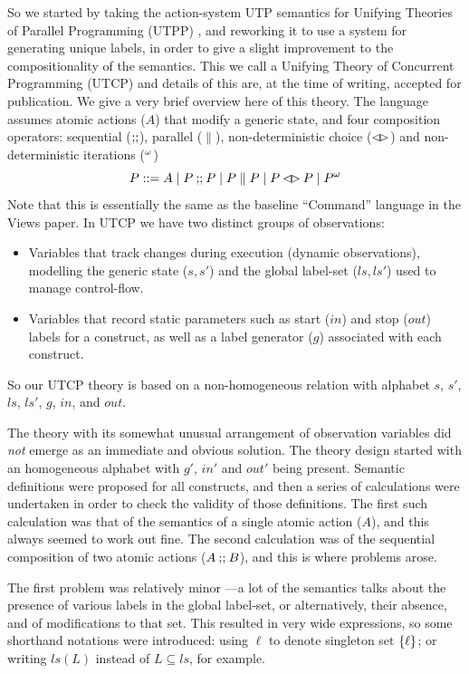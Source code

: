 So we started by taking the action-system UTP semantics for Unifying Theories
of Parallel Programming (UTPP) \cite{DBLP:conf/icfem/WoodcockH02},
and reworking it to use a system for generating unique labels,
in order to give a slight improvement to the compositionality
of the semantics. This we call a Unifying Theory of Concurrent Programming
(UTCP) and details of this are,
at the time of writing,
accepted for publication\cite{conf/tase/BMN16}.
We give a very brief overview here of this theory.
The language assumes atomic actions ($A$) that modify a generic state,
and four composition operators: sequential ($\mathrel{\mathbf{;\!;}}$), parallel ($\parallel$),
non-deterministic choice ($\mathbin{\lhd\!\rhd}$) and non-deterministic iterations (${}^{\omega}$)
\[
   P ::= A \mid P \mathbin{\mathbf{;\!;}} P \mid P \parallel P \mid P \mathbin{\lhd\!\rhd} P \mid {P}^{\omega}
\]
Note that this is essentially the same as the baseline ``Command'' language
in the Views paper\cite{conf/popl/Dinsdale-YoungBGPY13}.
In UTCP we have two distinct groups of observations:
\begin{itemize}
  \item
    Variables that track changes during execution
    (dynamic observations),
    modelling the generic state ($s,s'$)
    and the global label-set ($ls,ls'$) used to manage control-flow.
  \item
    Variables that record static parameters such as start ($in$)
    and stop ($out$) labels for a construct,
    as well as a label generator ($g$) associated with each construct.
\end{itemize}
So our UTCP theory is based on a non-homogeneous relation
with alphabet $s$, $s'$, $ls$, $ls'$, $g$, $in$, and $out$.


The theory with its somewhat unusual arrangement of observation variables
did \emph{not} emerge as an immediate and obvious solution.
The theory design started with an homogeneous alphabet with $g'$, $in'$ and $out'$
being present.
Semantic definitions were proposed for all constructs,
and then a series of calculations were undertaken in order to check
the validity of those definitions.
The first such calculation was that of the semantics of a single atomic
action ($A$), and this always seemed to work out fine.
The second calculation was of the sequential composition of two atomic
actions ($A\mathbin{\mathbf{;\!;}} B$), and this is where problems arose.

The first problem was relatively minor
---a lot of the semantics talks about the presence of various
labels in the global label-set, or alternatively, their  absence,
and of modifications to that set.
This resulted in very wide expressions,
so some shorthand notations were introduced:
using $\ell$ to denote singleton set $\{{\ell}\}$;
or writing $ls(L)$ instead of $L \subseteq ls$, for example.

